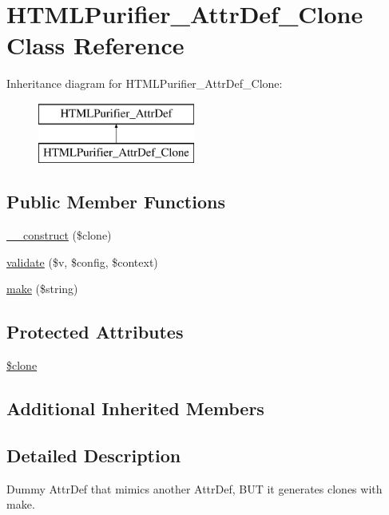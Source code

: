 \hypertarget{classHTMLPurifier__AttrDef__Clone}{\section{H\+T\+M\+L\+Purifier\+\_\+\+Attr\+Def\+\_\+\+Clone Class Reference}
\label{classHTMLPurifier__AttrDef__Clone}
}
Inheritance diagram for H\+T\+M\+L\+Purifier\+\_\+\+Attr\+Def\+\_\+\+Clone\+:\begin{figure}[H]
\begin{center}
\leavevmode
\includegraphics[height=2.000000cm]{classHTMLPurifier__AttrDef__Clone}
\end{center}
\end{figure}
\subsection*{Public Member Functions}
\begin{DoxyCompactItemize}
\item 
\hyperlink{classHTMLPurifier__AttrDef__Clone_a8548c9a4eab4797e4d19fba593e7a2e3}{\+\_\+\+\_\+construct} (\$clone)
\item 
\hyperlink{classHTMLPurifier__AttrDef__Clone_ace270eb306c3cf6fcc966317cd54f8f9}{validate} (\$v, \$config, \$context)
\item 
\hyperlink{classHTMLPurifier__AttrDef__Clone_a89b35bf7694347b513cc93073ee8b846}{make} (\$string)
\end{DoxyCompactItemize}
\subsection*{Protected Attributes}
\begin{DoxyCompactItemize}
\item 
\hyperlink{classHTMLPurifier__AttrDef__Clone_a5d374993e70cf416ba63e8c2424ad79a}{\$clone}
\end{DoxyCompactItemize}
\subsection*{Additional Inherited Members}


\subsection{Detailed Description}
Dummy Attr\+Def that mimics another Attr\+Def, B\+U\+T it generates clones with make. 

